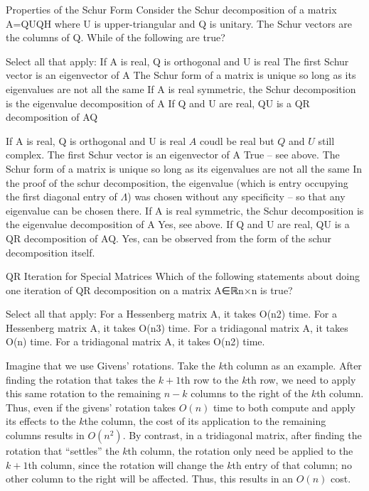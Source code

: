\documentclass[../main.tex]{subfiles}
\begin{document}
\begin{problem}
    Properties of the Schur Form
 Consider the Schur decomposition of a matrix A=QUQH where U is upper-triangular and Q is unitary. The Schur vectors are the columns of Q. While of the following are true?

Select all that apply:
If A is real, Q is orthogonal and U is real
The first Schur vector is an eigenvector of A
The Schur form of a matrix is unique so long as its eigenvalues are not all the same
If A is real symmetric, the Schur decomposition is the eigenvalue decomposition of A
If Q and U are real, QU is a QR decomposition of AQ
    
\end{problem}
\begin{solution}
    \begin{outline}
\1 If A is real, Q is orthogonal and U is real
\2 $A$ coudl be real but $Q$ and $U$ still complex.
\1 The first Schur vector is an eigenvector of A
\2 True -- see above.
\1 The Schur form of a matrix is unique so long as its eigenvalues are not all the same
\2 In the proof of the schur decomposition, the eigenvalue (which is entry occupying the first diagonal entry of $\Lambda$)  was chosen without any specificity -- so that any eigenvalue can be chosen there.
\1 If A is real symmetric, the Schur decomposition is the eigenvalue decomposition of A
\2 Yes, see above.
\2 If Q and U are real, QU is a QR decomposition of AQ.
\2 Yes, can be observed from the form of the schur decomposition itself.
    \end{outline}
    
\end{solution}

\begin{problem}
    QR Iteration for Special Matrices
Which of the following statements about doing one iteration of QR decomposition on a matrix A∈ℝn×n is true?

Select all that apply:
For a Hessenberg matrix A, it takes O(n2) time.
For a Hessenberg matrix A, it takes O(n3) time.
For a tridiagonal matrix A, it takes O(n) time.
For a tridiagonal matrix A, it takes O(n2) time.
\end{problem}

\begin{solution}
    Imagine that we use Givens' rotations. Take the $k$th column as an example. After finding the rotation that takes the $k+1$th row to the $k$th row, we need to apply this same rotation to the remaining $n-k$ columns to the right of the $k$th column. Thus, even if the givens' rotation takes $O(n)$ time to both compute and apply its effects to the $k$the column, the cost of its application to the remaining columns results in $O(n^2)$. By contrast, in a tridiagonal matrix, after finding the rotation that ``settles'' the $k$th column, the rotation only need be applied to the $k+1$th column, since the rotation will change the $k$th entry of that column; no other column to the right will be affected. Thus, this results in an $O(n)$ cost.
\end{solution}
\end{document}
